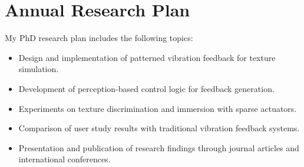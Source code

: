 \documentclass[graybox]{svmult}
\begin{document}
\section{Annual Research Plan}
\label{sec:conc}
My PhD research plan includes the following topics:
\begin{itemize}
	\item Design and implementation of patterned vibration feedback for texture simulation.
	\item Development of perception-based control logic for feedback generation.
	\item Experiments on texture discrimination and immersion with sparse actuators.
	\item Comparison of user study results with traditional vibration feedback systems.
	\item Presentation and publication of research findings through journal articles and international conferences.
\end{itemize}
\end{document}
